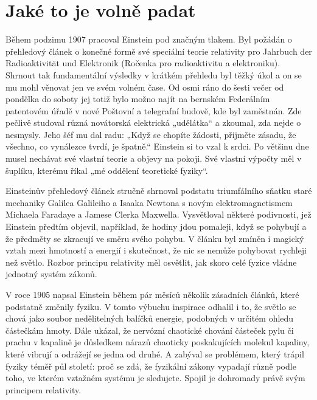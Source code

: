 \section{Jaké to je volně padat}\label{kulIchIIIsecII}
  Během podzimu 1907 pracoval Einstein pod značným tlakem. Byl požádán o přehledový článek o konečné
  formě své speciální teorie relativity pro Jahrbuch der Radioaktivität und Elektronik (Ročenka pro
  radioaktivitu a elektroniku). Shrnout tak fundamentální výsledky v krátkém přehledu byl těžký úkol
  a on se mu mohl věnovat jen ve svém volném čase. Od osmi ráno do šesti večer od pondělka do soboty
  jej totiž bylo možno najít na bernském Federálním patentovém úřadě v nové Poštovní a telegrafní
  budově, kde byl zaměstnán. Zde pečlivě studoval různá novátorská elektrická „udělátka“ a zkoumal,
  zda nejde o nesmysly. Jeho šéf mu dal radu: „Když se chopíte žádosti, přijměte zásadu, že všechno,
  co vynálezce tvrdí, je špatně.“ Einstein si to vzal k srdci. Po většinu dne musel nechávat své
  vlastní teorie a objevy na pokoji. Své vlastní výpočty měl v šuplíku, kterému říkal „mé oddělení
  teoretické fyziky“. 

  Einsteinův přehledový článek stručně shrnoval podstatu triumfálního sňatku staré mechaniky Galilea
  Galileiho a Isaaka Newtona s novým elektromagnetismem Michaela Faradaye a Jamese Clerka Maxwella.
  Vysvětloval některé podivnosti, jež Einstein předtím objevil, například, že hodiny jdou pomaleji,
  když se pohybují a že předměty se zkracují ve směru svého pohybu. V článku byl zmíněn i magický
  vztah mezi hmotností a energií i skutečnost, že nic se nemůže pohybovat rychleji než světlo.
  Rozbor principu relativity měl osvětlit, jak skoro celé fyzice vládne jednotný systém zákonů.  

  V roce 1905 napsal Einstein během pár měsíců několik zásadních článků, které podstatně změnily
  fyziku. V tomto výbuchu inspirace odhalil i to, že světlo se chová jako soubor nedělitelných
  balíčků energie, podobných v určitém ohledu částečkám hmoty. Dále ukázal, že nervózní chaotické
  chování částeček pylu či prachu v kapalině je důsledkem nárazů chaoticky poskakujících molekul
  kapaliny, které vibrují a odrážejí se jedna od druhé. A zabýval se problémem, který trápil fyziky
  téměř půl století: proč se zdá, že fyzikální zákony vypadají různě podle toho, ve kterém vztažném
  systému je sledujete. Spojil je dohromady právě svým principem relativity. 

